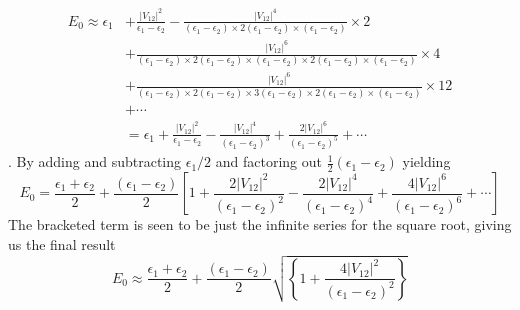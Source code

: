 \begin{equation}\begin{aligned}
E_{0} \approx \epsilon_{1} &+\frac{\left|V_{12}\right|^{2}}{\epsilon_{1}-\epsilon_{2}}-\frac{\left|V_{12}\right|^{4}}{\left(\epsilon_{1}-\epsilon_{2}\right) \times 2\left(\epsilon_{1}-\epsilon_{2}\right) \times\left(\epsilon_{1}-\epsilon_{2}\right)} \times 2 \\
&+\frac{\left|V_{12}\right|^{6}}{\left(\epsilon_{1}-\epsilon_{2}\right) \times 2\left(\epsilon_{1}-\epsilon_{2}\right) \times\left(\epsilon_{1}-\epsilon_{2}\right) \times 2\left(\epsilon_{1}-\epsilon_{2}\right) \times\left(\epsilon_{1}-\epsilon_{2}\right)} \times 4 \\
&+\frac{\left|V_{12}\right|^{6}}{\left(\epsilon_{1}-\epsilon_{2}\right) \times 2\left(\epsilon_{1}-\epsilon_{2}\right) \times 3\left(\epsilon_{1}-\epsilon_{2}\right) \times 2\left(\epsilon_{1}-\epsilon_{2}\right) \times\left(\epsilon_{1}-\epsilon_{2}\right)} \times 12 \\
&+\cdots\\
&=\epsilon_{1}+\frac{\left|V_{12}\right|^{2}}{\epsilon_{1}-\epsilon_{2}}-\frac{\left|V_{12}\right|^{4}}{\left(\epsilon_{1}-\epsilon_{2}\right)^{3}}+\frac{2\left|V_{12}\right|^{6}}{\left(\epsilon_{1}-\epsilon_{2}\right)^{5}}+\cdots
\end{aligned}\end{equation}
. By adding and subtracting $\epsilon_{1} / 2$ and factoring out $\frac{1}{2}\left(\epsilon_{1}-\epsilon_{2}\right)$ yielding
\begin{equation}E_{0}=\frac{\epsilon_{1}+\epsilon_{2}}{2}+\frac{\left(\epsilon_{1}-\epsilon_{2}\right)}{2}\left[1+\frac{2\left|V_{12}\right|^{2}}{\left(\epsilon_{1}-\epsilon_{2}\right)^{2}}-\frac{2\left|V_{12}\right|^{4}}{\left(\epsilon_{1}-\epsilon_{2}\right)^{4}}+\frac{4\left|V_{12}\right|^{6}}{\left(\epsilon_{1}-\epsilon_{2}\right)^{6}}+\cdots\right]\end{equation}
The bracketed term is seen to be just the infinite series for the square root, giving us the final result
\begin{equation}E_{0} \approx \frac{\epsilon_{1}+\epsilon_{2}}{2}+\frac{\left(\epsilon_{1}-\epsilon_{2}\right)}{2} \sqrt{\left\{1+\frac{4\left|V_{12}\right|^{2}}{\left(\epsilon_{1}-\epsilon_{2}\right)^{2}}\right\}}\end{equation}
